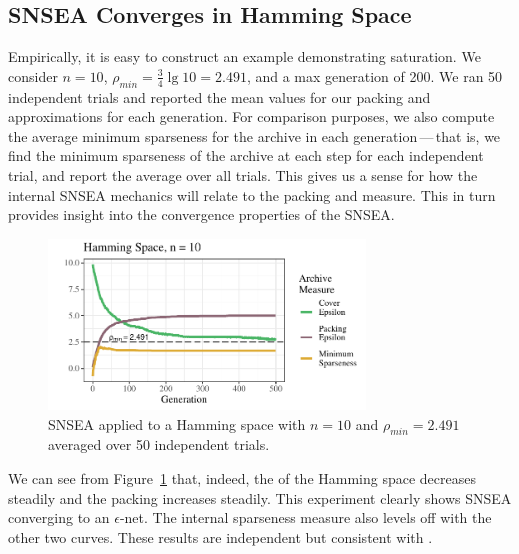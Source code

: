 \documentclass[twoside]{article}
\begin{document}
\subsection{SNSEA Converges in Hamming Space}
\label{subsec:hamming}

Empirically, it is easy to construct an example demonstrating saturation.  We consider $n=10$, $\rho_{min} = \frac{3}{4} \lg 10 = 2.491$, and a max generation of 200.  We ran 50 independent trials and reported the mean values for our packing and  approximations for each generation.  For comparison purposes, we also compute the average minimum sparseness for the archive in each generation\,---\,that is, we find the minimum sparseness of the archive at each step for each independent trial, and report the average over all trials.  This gives us a sense for how the internal SNSEA mechanics will relate to the packing and  measure.  This in turn provides insight into the convergence properties of the SNSEA.
%
\begin{figure}[h]
  \center\includegraphics[width=0.75\textwidth]{Figures/hamming-500-n10-NOPOP.pdf}
  \caption{\label{fig:hamming:nopop:n10} SNSEA applied to a Hamming space with $n=10$ and $\rho_{min} = 2.491$ averaged over 50 independent trials.}
\end{figure}

We can see from Figure~\ref{fig:hamming:nopop:n10} that, indeed, the  of the Hamming space decreases steadily and the packing increases steadily.  This experiment clearly shows SNSEA converging to an $\epsilon$-net.  The internal sparseness measure also levels off with the other two curves.  These results are independent but consistent with \citep{Wiegand2020flairs}.  
\end{document}
